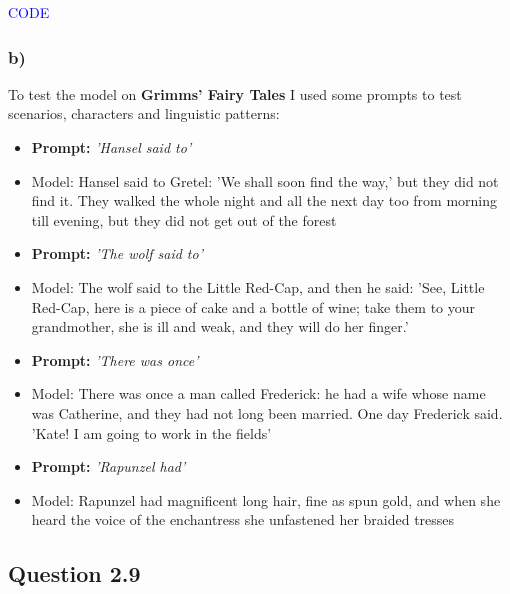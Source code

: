 \documentclass{article}
\begin{document}
\textcolor{blue}{CODE}

\subsubsection*{b)}

To test the model on \textbf{Grimms' Fairy Tales} I used some prompts to test scenarios, characters and linguistic patterns:

\begin{itemize}
    \item \textbf{Prompt:} \textit{'Hansel said to'} 
    \item Model: Hansel said to Gretel: 'We shall soon find the way,' but they did not find it. They walked the whole night and all the next day too from morning till evening, but they did not get out of the forest
\end{itemize}

\begin{itemize}
    \item \textbf{Prompt:} \textit{'The wolf said to'}
    \item Model: The wolf said to the Little Red-Cap, and then he said: 'See, Little Red-Cap, here is a piece
of cake and a bottle of wine; take them to your grandmother, she is ill
and weak, and they will do her finger.'
\end{itemize}

\begin{itemize}
    \item \textbf{Prompt:} \textit{'There was once'}
    \item Model: There was once a man called Frederick: he had a wife whose name was
Catherine, and they had not long been married. One day Frederick said.
'Kate! I am going to work in the fields'
\end{itemize}

\begin{itemize}
    \item \textbf{Prompt:} \textit{'Rapunzel had'}
    \item Model: Rapunzel had magnificent long hair, fine as spun gold, and when she
heard the voice of the enchantress she unfastened her braided tresses
\end{itemize}

\subsection*{Question 2.9}
\end{document}
